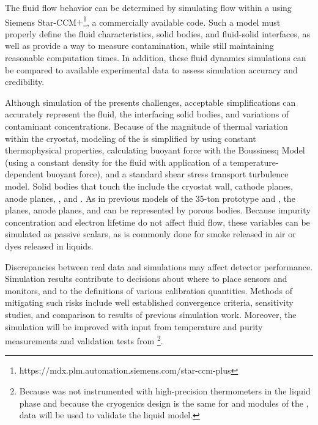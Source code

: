 The fluid flow behavior can be determined by simulating  flow within a  %
using Siemens Star-CCM$+$\footnote{https://mdx.plm.automation.siemens.com/star-ccm-plus}, a commercially available  code.  Such a model must properly define the fluid characteristics, solid bodies, and fluid-solid interfaces, as well as provide a way to measure contamination, while still maintaining reasonable computation times. In addition, these fluid dynamics simulations can be compared to available experimental data to assess simulation accuracy and credibility.



Although simulation of the  presents challenges, %
acceptable simplifications can %
accurately represent the fluid, the interfacing solid bodies, and variations of contaminant concentrations. Because of the magnitude of thermal variation within the cryostat, modeling of the  is simplified by using constant thermophysical properties, calculating buoyant force with the Boussinesq Model (using a constant density for the fluid with application of a temperature-dependent buoyant force), and a standard shear stress transport turbulence model. Solid bodies that touch the  include the cryostat wall, cathode planes, anode planes, , and . As in previous  models of the  35-ton prototype and 
\cite{bib:docdb5915}, the  planes, anode planes, and  can be represented by porous bodies. Because impurity concentration and electron lifetime do not affect fluid flow, these variables can be simulated as passive scalars, as is commonly done for smoke released \cite{cfd-1} 
in air or dyes released in liquids.


Discrepancies between real data and simulations may affect detector performance. %
Simulation results contribute to decisions about where to place sensors and monitors, and to %
the definitions of various calibration quantities. Methods of mitigating such risks include well established convergence criteria, sensitivity studies, and comparison to results of previous  simulation work. Moreover, the simulation will be improved with input from \lar temperature and purity measurements and validation tests from \footnote{Because  was not instrumented with high-precision thermometers in the liquid phase and because the cryogenics design is the same for  and  modules of the  ,  data will be used to validate the liquid  model.}. 

